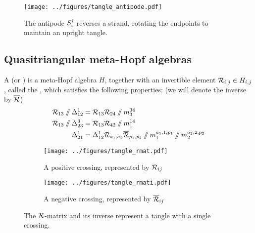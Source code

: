 \documentclass{beamer}
\begin{document}
\begin{frame}
        \begin{figure}
        \centering
        \texttt{[image: ../figures/tangle\_antipode.pdf]}
        \caption{The antipode $S^{i}_{i}$ reverses a strand, rotating the
        endpoints to maintain an upright tangle.}
        \label{fig:tangle_antipode}
\end{figure}
\end{frame}

\subsection{Quasitriangular meta-Hopf algebras}

\begin{frame}
        \begin{definition}
        A  (or ) is a meta-Hopf algebra $H$, together with an invertible element
        $\mathcal{R}_{i,j} \in H_{i,j}$, called the , which satisfies the
        following properties: (we will denote the inverse by $\overline{\mathcal{R}}$)
        \begin{align}
                \label{eq:Rmat_understrand}
                \Rmat_{13}\then\comult^{1}_{12}&=\Rmat_{13}\Rmat_{24}\then\mult^{34}_3\\
                \label{eq:Rmat_overstrand}
                \Rmat_{13}\then\comult^{3}_{23}&=\Rmat_{13}\Rmat_{42}\then\mult^{14}_1\\
                \label{eq:Rmat_comult}
                \comult^{1}_{21} &=
                        \comult^{1}_{12} \Rmat_{a_1,a_2}\Rmati_{p_1,p_2}\then
                        \mult^{a_1,1,p_1}_{1}\then \mult^{a_2,2,p_2}_{2}
        \end{align}
        \end{definition}
\end{frame}

\begin{frame}
        \begin{figure}
                \centering
                \begin{subfigure}[b]{0.4\textwidth}
                        \centering
                        \texttt{[image: ../figures/tangle\_rmat.pdf]}
                        \caption{A positive crossing, represented by $\mathcal{R}_{ij}$}
                        \label{fig:tangle_rmat}
                \end{subfigure}
                \begin{subfigure}[b]{0.4\textwidth}
                        \centering
                        \texttt{[image: ../figures/tangle\_rmati.pdf]}
                        \caption{A negative crossing, represented by $\overline{\mathcal{R}}_{ij}$}
                        \label{fig:tangle_rmati}
                \end{subfigure}
                \caption{The $\mathcal{R}$-matrix and its inverse represent a tangle with a
                single crossing.}
                \label{fig:tangle_rmats}
        \end{figure}
\end{frame}
\end{document}
